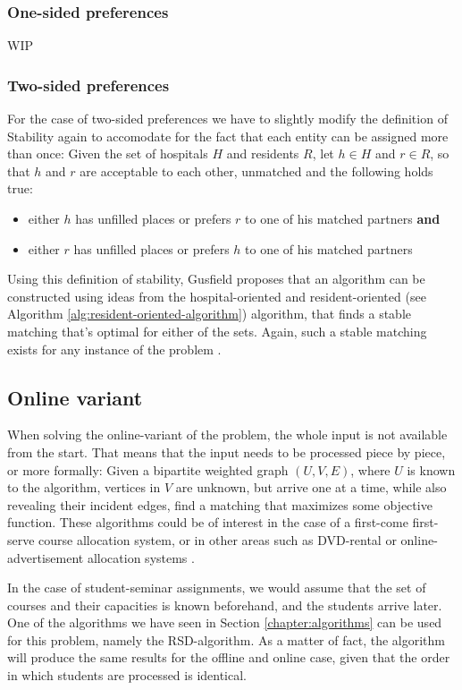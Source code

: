\subsubsection{One-sided preferences}
WIP

\subsubsection{Two-sided preferences}
For the case of two-sided preferences we have to slightly modify the definition of Stability again to accomodate for the fact that each entity can be assigned more than once: Given the set of hospitals $H$ and residents $R$, let $h \in H$ and $r \in R$, so that $h$ and $r$ are acceptable to each other, unmatched and the following holds true: 
\begin{itemize}
    \item either $h$ has unfilled places or prefers $r$ to one of his matched partners \textbf{and}
    \item either $r$ has unfilled places or prefers $h$ to one of his matched partners
\end{itemize}
Using this definition of stability, Gusfield\cite{Gusfield} proposes that an algorithm can be constructed using ideas from the hospital-oriented and resident-oriented (see Algorithm \ref{alg:resident-oriented-algorithm}) algorithm, that finds a stable matching that's optimal for either of the sets. Again, such a stable matching exists for any instance of the problem \cite{Gusfield}.

\subsection{Online variant}
When solving the online-variant of the problem, the whole input is not available from the start. That means that the input needs to be processed piece by piece, or more formally: Given a bipartite weighted graph $(U, V, E)$, where $U$ is known to the algorithm, vertices in $V$ are unknown, but arrive one at a time, while also revealing their incident edges, find a matching that maximizes some objective function. These algorithms could be of interest in the case of a first-come first-serve course allocation system, or in other areas such as DVD-rental or online-advertisement allocation systems \cite{Mehta:Online}.

In the case of student-seminar assignments, we would assume that the set of courses and their capacities is known beforehand, and the students arrive later. One of the algorithms we have seen in Section \ref{chapter:algorithms} can be used for this problem, namely the RSD-algorithm. As a matter of fact, the algorithm will produce the same results for the offline and online case, given that the order in which students are processed is identical.

